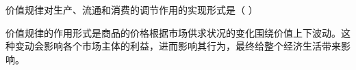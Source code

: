 \question 价值规律对生产、流通和消费的调节作用的实现形式是（ ）
\par{}
\begin{solution}价值规律的作用形式是商品的价格根据市场供求状况的变化围绕价值上下波动。这种变动会影响各个市场主体的利益，进而影响其行为，最终给整个经济生活带来影响。
\end{solution}
